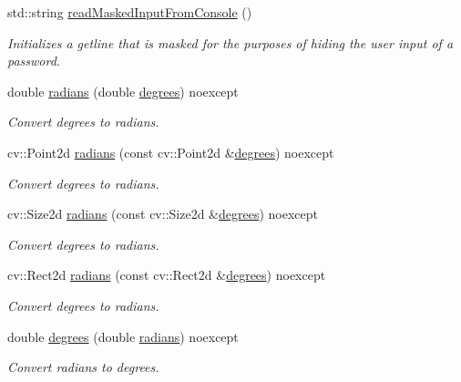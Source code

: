 \begin{DoxyCompactItemize}
std\+::string \hyperlink{group___utility_module_ga3d0cf89b2a18e61bc8c07ae4006c9744}{read\+Masked\+Input\+From\+Console} ()
\begin{DoxyCompactList}\small\item\em Initializes a getline that is masked for the purposes of hiding the user input of a password. \end{DoxyCompactList}\item 
double \hyperlink{group___utility_module_ga547c4f80c778878854c572c297cc1983}{radians} (double \hyperlink{group___utility_module_gac74d2fa0aeac8bd310ed61663a153e84}{degrees}) noexcept
\begin{DoxyCompactList}\small\item\em Convert degrees to radians. \end{DoxyCompactList}\item 
cv\+::\+Point2d \hyperlink{group___utility_module_ga8ce4d2c11e35fe075404a256c272b4d8}{radians} (const cv\+::\+Point2d \&\hyperlink{group___utility_module_gac74d2fa0aeac8bd310ed61663a153e84}{degrees}) noexcept
\begin{DoxyCompactList}\small\item\em Convert degrees to radians. \end{DoxyCompactList}\item 
cv\+::\+Size2d \hyperlink{group___utility_module_gabf4e708fbdf32c6c93035b918d7ffa03}{radians} (const cv\+::\+Size2d \&\hyperlink{group___utility_module_gac74d2fa0aeac8bd310ed61663a153e84}{degrees}) noexcept
\begin{DoxyCompactList}\small\item\em Convert degrees to radians. \end{DoxyCompactList}\item 
cv\+::\+Rect2d \hyperlink{group___utility_module_ga7712032c74d8bc4e9c392964d4e18e8c}{radians} (const cv\+::\+Rect2d \&\hyperlink{group___utility_module_gac74d2fa0aeac8bd310ed61663a153e84}{degrees}) noexcept
\begin{DoxyCompactList}\small\item\em Convert degrees to radians. \end{DoxyCompactList}\item 
double \hyperlink{group___utility_module_gac74d2fa0aeac8bd310ed61663a153e84}{degrees} (double \hyperlink{group___utility_module_ga547c4f80c778878854c572c297cc1983}{radians}) noexcept
\begin{DoxyCompactList}\small\item\em Convert radians to degrees. \end{DoxyCompactList}\item 

\end{DoxyCompactItemize}
